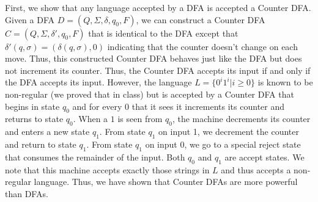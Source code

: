 \documentclass[12pt]{article}
\begin{document}
First, we show that any language accepted by a DFA is accepted a Counter DFA.  Given a DFA $D = (Q, \Sigma, \delta, q_0, F)$, we can construct a Counter DFA
$C = (Q, \Sigma, \delta', q_0, F)$ that is identical to the DFA except that $\delta'(q, \sigma) = (\delta(q, \sigma), 0)$ indicating that the counter doesn't change on each move.
 Thus, this constructed Counter DFA behaves just like the DFA but does not increment its counter.  Thus, the Counter DFA accepts its input if and only if the DFA accepts its input.  However, the language $L = \{0^i 1^i | i \geq 0 \}$ is known to be non-regular (we proved that in class) but is accepted by a Counter DFA that begins in state $q_0$ and for every 0 that it sees it increments its counter and returns to state $q_0$.  When a $1$ is seen from $q_0$, the machine decrements its counter and enters a new state $q_1$.  From state $q_1$ on input 1, we decrement the counter and return to state $q_1$.  From state $q_1$ on input 0, we go to a special reject state that consumes the remainder of the input.  Both $q_0$ and $q_1$ are accept states.  We note that this machine accepts exactly those strings in $L$ and thus accepts a non-regular language.  Thus, we have shown that Counter DFAs are more powerful than DFAs.
\end{document}
